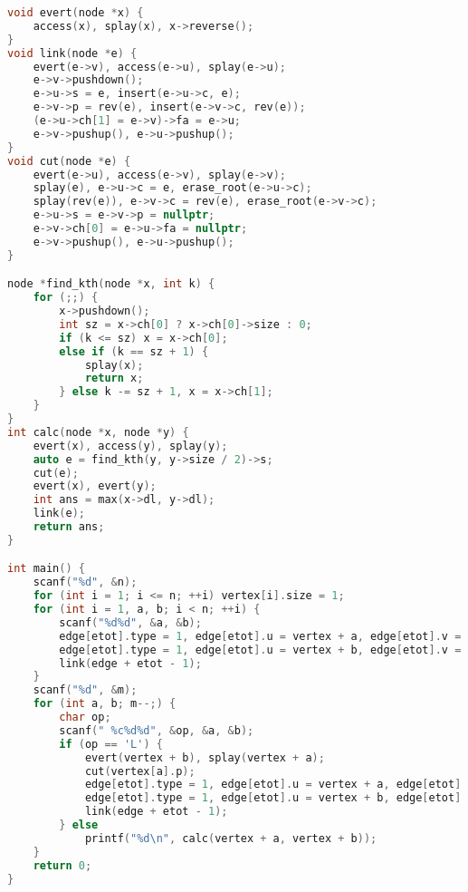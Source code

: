 \begin{lstlisting}[language=C++]
void evert(node *x) {
	access(x), splay(x), x->reverse();
}
void link(node *e) {
	evert(e->v), access(e->u), splay(e->u);
	e->v->pushdown();
	e->u->s = e, insert(e->u->c, e);
	e->v->p = rev(e), insert(e->v->c, rev(e));
	(e->u->ch[1] = e->v)->fa = e->u;
	e->v->pushup(), e->u->pushup();
}
void cut(node *e) {
	evert(e->u), access(e->v), splay(e->v);
	splay(e), e->u->c = e, erase_root(e->u->c);
	splay(rev(e)), e->v->c = rev(e), erase_root(e->v->c);
	e->u->s = e->v->p = nullptr;
	e->v->ch[0] = e->u->fa = nullptr;
	e->v->pushup(), e->u->pushup();
}

node *find_kth(node *x, int k) {
	for (;;) {
		x->pushdown();
		int sz = x->ch[0] ? x->ch[0]->size : 0;
		if (k <= sz) x = x->ch[0];
		else if (k == sz + 1) {
			splay(x);
			return x;
		} else k -= sz + 1, x = x->ch[1];
	}
}
int calc(node *x, node *y) {
	evert(x), access(y), splay(y);
	auto e = find_kth(y, y->size / 2)->s;
	cut(e);
	evert(x), evert(y);
	int ans = max(x->dl, y->dl);
	link(e);
	return ans;
}

int main() {
	scanf("%d", &n);
	for (int i = 1; i <= n; ++i) vertex[i].size = 1;
	for (int i = 1, a, b; i < n; ++i) {
		scanf("%d%d", &a, &b);
		edge[etot].type = 1, edge[etot].u = vertex + a, edge[etot].v = vertex + b, ++etot;
		edge[etot].type = 1, edge[etot].u = vertex + b, edge[etot].v = vertex + a, ++etot;
		link(edge + etot - 1);
	}
	scanf("%d", &m);
	for (int a, b; m--;) {
		char op;
		scanf(" %c%d%d", &op, &a, &b);
		if (op == 'L') {
			evert(vertex + b), splay(vertex + a);
			cut(vertex[a].p);
			edge[etot].type = 1, edge[etot].u = vertex + a, edge[etot].v = vertex + b, ++etot;
			edge[etot].type = 1, edge[etot].u = vertex + b, edge[etot].v = vertex + a, ++etot;
			link(edge + etot - 1);
		} else
			printf("%d\n", calc(vertex + a, vertex + b));
	}
	return 0;
}
\end{lstlisting}